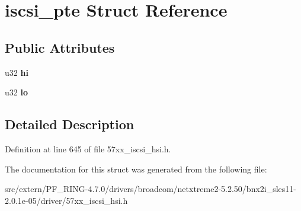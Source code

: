 \hypertarget{structiscsi__pte}{
\section{iscsi\_\-pte Struct Reference}
\label{structiscsi__pte}
}
\subsection*{Public Attributes}
\begin{DoxyCompactItemize}
\item 
\hypertarget{structiscsi__pte_a9083843898a8cf83b0de33dba5e52764}{
u32 {\bfseries hi}}
\label{structiscsi__pte_a9083843898a8cf83b0de33dba5e52764}

\item 
\hypertarget{structiscsi__pte_adc8600d84b142338735fcc0751624fe4}{
u32 {\bfseries lo}}
\label{structiscsi__pte_adc8600d84b142338735fcc0751624fe4}

\end{DoxyCompactItemize}


\subsection{Detailed Description}


Definition at line 645 of file 57xx\_\-iscsi\_\-hsi.h.



The documentation for this struct was generated from the following file:\begin{DoxyCompactItemize}
\item 
src/extern/PF\_\-RING-\/4.7.0/drivers/broadcom/netxtreme2-\/5.2.50/bnx2i\_\-sles11-\/2.0.1e-\/05/driver/57xx\_\-iscsi\_\-hsi.h\end{DoxyCompactItemize}
